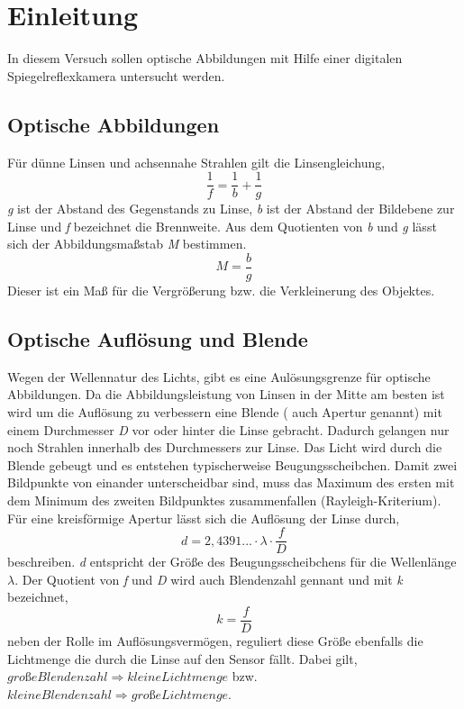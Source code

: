 \section{Einleitung}
In diesem Versuch sollen optische Abbildungen mit Hilfe einer digitalen Spiegelreflexkamera untersucht werden.
\subsection{Optische Abbildungen}
Für dünne Linsen und achsennahe Strahlen gilt die Linsengleichung,
\begin{equation}
\frac{1}{f}=\frac{1}{b}+\frac{1}{g}
\end{equation}
\textit{g} ist der Abstand des Gegenstands zu Linse, \textit{b} ist der Abstand der Bildebene zur Linse und \textit{f} bezeichnet die Brennweite.
Aus dem Quotienten von \textit{b} und \textit{g} lässt sich der Abbildungsmaßstab \textit{M} bestimmen.
\begin{equation}
M=\frac{b}{g}
\end{equation}
Dieser ist ein Maß für die Vergrößerung bzw. die Verkleinerung des Objektes.
\subsection{Optische Auflösung und Blende}
Wegen der Wellennatur des Lichts, gibt es eine Aulösungsgrenze für optische Abbildungen. Da die Abbildungsleistung von Linsen in der Mitte am besten ist wird um die Auflösung zu verbessern eine Blende ( auch Apertur genannt) mit einem Durchmesser \textit{D} vor oder hinter die Linse gebracht. Dadurch gelangen nur noch Strahlen innerhalb des Durchmessers zur Linse. Das Licht wird durch die Blende gebeugt und es entstehen typischerweise Beugungsscheibchen. Damit zwei Bildpunkte von einander unterscheidbar sind, muss das Maximum des ersten mit dem Minimum des zweiten Bildpunktes zusammenfallen (Rayleigh-Kriterium).
Für eine kreisförmige Apertur lässt sich die Auflösung der Linse durch,
\begin{equation}
d=2,4391...\cdot\lambda\cdot\frac{f}{D}
\end{equation}
beschreiben. \textit{d} entspricht der Größe des Beugungsscheibchens für die Wellenlänge $ \lambda $.
Der Quotient von \textit{f} und \textit{D} wird auch Blendenzahl gennant und mit \textit{k} bezeichnet,
\begin{equation}
k=\frac{f}{D}
\end{equation}
neben der Rolle im Auflösungsvermögen, reguliert diese Größe ebenfalls die Lichtmenge die durch die Linse auf den Sensor fällt.
Dabei gilt,$ große Blendenzahl \Rightarrow kleine Lichtmenge $ bzw.
$ kleine Blendenzahl \Rightarrow große Lichtmenge $.
